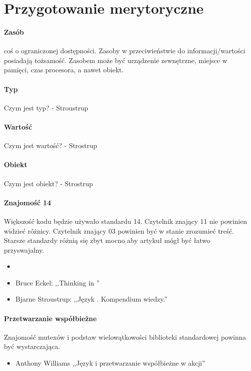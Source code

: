 \section{Przygotowanie merytoryczne}
\paragraph{Zasób}
coś o ograniczonej dostępności. Zasoby w przeciwieństwie do informacji/wartości posiadają tożsamość. Zasobem może być urządzenie zewnętrzne, miejsce w pamięci, czas procesora, a nawet obiekt.

\paragraph{Typ}
Czym jest typ? - Stroustrup

\paragraph{Wartość}
Czym jest wartość? - Strostrup

\paragraph{Obiekt}
Czym jest obiekt? - Strostrup

\paragraph{Znajomość \Cpp{}14}
Większość kodu będzie używało standardu \Cpp{}14. Czytelnik znający \Cpp{}11 nie powinien widzieć różnicy. Czytelnik znający \Cpp{}03 powinien być w stanie zrozumieć treść. Starsze standardy różnią się zbyt mocno aby artykuł mógł być łatwo przyswajalny.
\begin{itemize}
\item {}
\item Bruce Eckel: ,,Thinking in \Cpp''
\item Bjarne Stroustrup: ,,Język \Cpp. Kompendium wiedzy.''
\end{itemize}

\paragraph{Przetwarzanie współbieżne}
Znajomość mutexów i podstaw wielowątkowości biblioteki standardowej \Cpp{} powinna być wystarczająca.
\begin{itemize}
\item Anthony Williams ,,Język \Cpp{} i przetwarzanie współbieżne w akcji''
\end{itemize}


